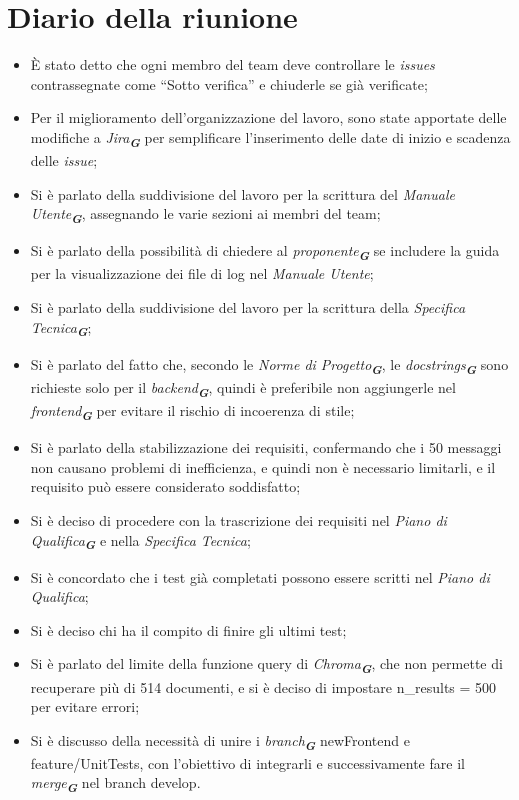 
\section{Diario della riunione}

\begin{itemize}
    \item È stato detto che ogni membro del team deve controllare le \emph{issues} contrassegnate come “Sotto verifica” e chiuderle se già verificate;
    \item Per il miglioramento dell'organizzazione del lavoro, sono state apportate delle modifiche a \emph{Jira}\textsubscript{\textit{\textbf{G}}} per semplificare l’inserimento delle date di inizio e scadenza delle \emph{issue};
    \item Si è parlato della suddivisione del lavoro per la scrittura del \emph{Manuale Utente}\textsubscript{\textit{\textbf{G}}}, assegnando le varie sezioni ai membri del team;
    \item Si è parlato della possibilità di chiedere al \emph{proponente}\textsubscript{\textit{\textbf{G}}} se includere la guida per la visualizzazione dei file di log nel \emph{Manuale Utente};
    \item Si è parlato della suddivisione del lavoro per la scrittura della \emph{Specifica Tecnica}\textsubscript{\textit{\textbf{G}}};
    \item Si è parlato del fatto che, secondo le \emph{Norme di Progetto}\textsubscript{\textit{\textbf{G}}}, le \emph{docstrings}\textsubscript{\textit{\textbf{G}}} sono richieste solo per il \emph{backend}\textsubscript{\textit{\textbf{G}}}, quindi è preferibile non aggiungerle nel \emph{frontend}\textsubscript{\textit{\textbf{G}}} per evitare il rischio di incoerenza di stile;
    \item Si è parlato della stabilizzazione dei requisiti, confermando che i 50 messaggi non causano problemi di inefficienza, e quindi non è necessario limitarli, e il requisito può essere considerato soddisfatto;
    \item Si è deciso di procedere con la trascrizione dei requisiti nel \emph{Piano di Qualifica}\textsubscript{\textit{\textbf{G}}} e nella \emph{Specifica Tecnica};
    \item Si è concordato che i test già completati possono essere scritti nel \emph{Piano di Qualifica};
    \item Si è deciso chi ha il compito di finire gli ultimi test;
    \item Si è parlato del limite della funzione query di \emph{Chroma}\textsubscript{\textit{\textbf{G}}}, che non permette di recuperare più di 514 documenti, e si è deciso di impostare n\_results = 500 per evitare errori;
    \item Si è discusso della necessità di unire i \emph{branch}\textsubscript{\textit{\textbf{G}}} newFrontend e feature/UnitTests, con l’obiettivo di integrarli e successivamente fare il \emph{merge}\textsubscript{\textit{\textbf{G}}} nel branch develop.
\end{itemize}
